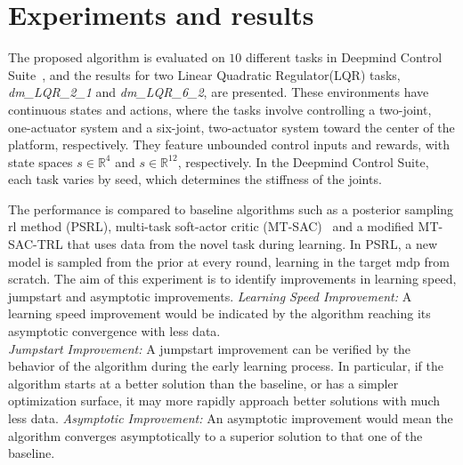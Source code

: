 %   

\section{Experiments and results}
The proposed algorithm is evaluated on $10$ different tasks in Deepmind Control Suite~\citep{tassa2018deepmind}, and the results for two Linear Quadratic Regulator(LQR) tasks, \emph{dm\_LQR\_2\_1} and \emph{dm\_LQR\_6\_2}, are presented. These environments have continuous states and actions, where the tasks involve controlling a two-joint, one-actuator system and a six-joint, two-actuator system toward the center of the platform, respectively. They feature unbounded control inputs and rewards, with state spaces $s \in \mathbb{R}^4$ and $s\in\mathbb{R}^{12}$, respectively. In the Deepmind Control Suite, each task varies by seed, which determines the stiffness of the joints.

The performance is compared to baseline algorithms such as a posterior sampling \gls{rl} method (PSRL), multi-task soft-actor critic (MT-SAC)~\citep{haarnoja2018soft, yu2020meta} and a modified MT-SAC-TRL that uses data from the novel task during learning. 
In PSRL, a new model is sampled from the prior at every round, learning in the target \gls{mdp} from scratch. 
The aim of this experiment is to identify improvements in learning speed, jumpstart and asymptotic improvements. 
\noindent \textit{Learning Speed Improvement:}
A learning speed improvement would be indicated by the algorithm reaching its asymptotic convergence with less data.\\
\noindent \textit{Jumpstart Improvement:}
A jumpstart improvement can be verified by the behavior of the algorithm during the early learning process. In particular, if the algorithm starts at a better solution than the baseline, or has a simpler optimization surface, it may more rapidly approach better solutions with much less data.%
\noindent \textit{Asymptotic Improvement:}
An asymptotic improvement would mean the algorithm converges asymptotically to a superior solution to that one of the baseline.\\

